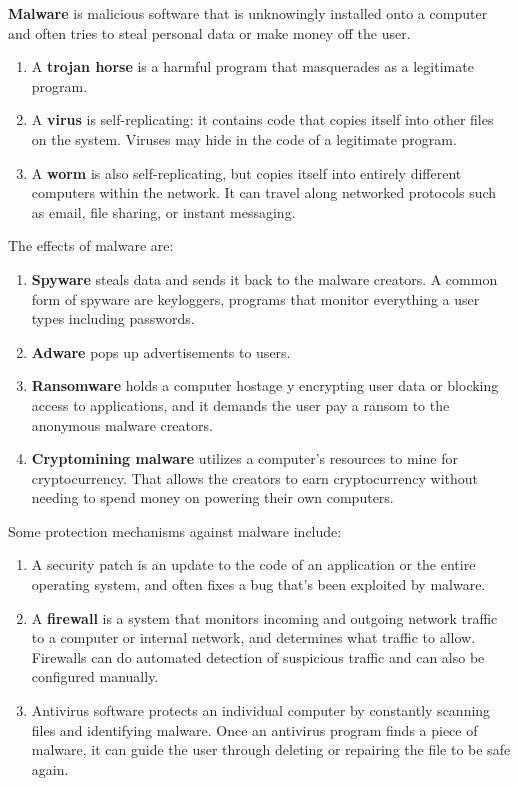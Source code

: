 \documentclass{article}
\newcounter{definition}[section]
\newcounter{code}[section]
\begin{document}
  \begin{definition}[Malware]
    \label{def:malware}
  \textbf{Malware} is malicious software that is unknowingly installed onto a computer and often tries to steal personal data or make money off the user. 
  \begin{enumerate}
      \item A \textbf{trojan horse} is a harmful program that masquerades as a legitimate program. 
      \item A \textbf{virus} is self-replicating: it contains code that copies itself into other files on the system. Viruses may hide in the code of a legitimate program. 
      \item A \textbf{worm} is also self-replicating, but copies itself into entirely different computers within the network. It can travel along networked protocols such as email, file sharing, or instant messaging. 
  \end{enumerate}
  The effects of malware are: 
  \begin{enumerate}
      \item \textbf{Spyware} steals data and sends it back to the malware creators. A common form of spyware are keyloggers, programs that monitor everything a user types including passwords. 
      \item \textbf{Adware} pops up advertisements to users.
      \item \textbf{Ransomware} holds a computer hostage y encrypting user data or blocking access to applications, and it demands the user pay a ransom to the anonymous malware creators. 
      \item \textbf{Cryptomining malware} utilizes a computer's resources to mine for cryptocurrency. That allows the creators to earn cryptocurrency without needing to spend money on powering their own computers.
  \end{enumerate}
  \end{definition}

  Some protection mechanisms against malware include: 
  \begin{enumerate}
      \item A security patch is an update to the code of an application or the entire operating system, and often fixes a bug that's been exploited by malware. 
      \item A \textbf{firewall} is a system that monitors incoming and outgoing network traffic to a computer or internal network, and determines what traffic to allow. Firewalls can do automated detection of suspicious traffic and can also be configured manually. 
      \item Antivirus software protects an individual computer by constantly scanning files and identifying malware. Once an antivirus program finds a piece of malware, it can guide the user through deleting or repairing the file to be safe again. 
  \end{enumerate}
\end{document}
